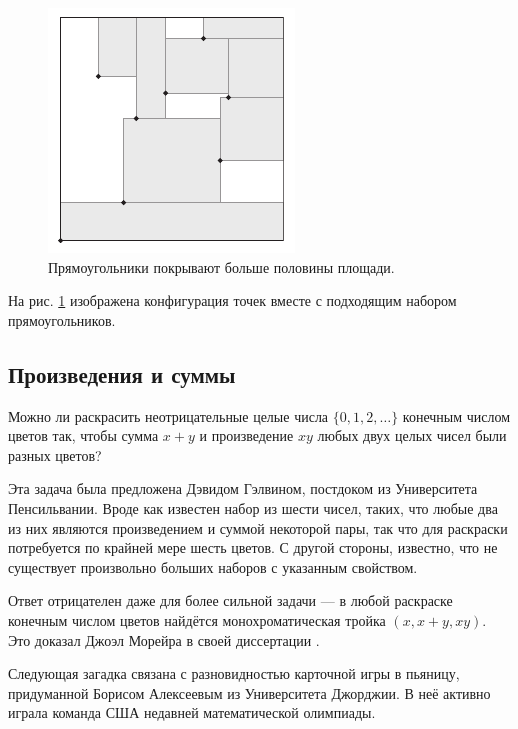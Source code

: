 \begin{figure}[htb!]
\centering
\includegraphics[scale=1]{pics/square}
\caption{Прямоугольники покрывают больше половины площади.}
\label{pic:square}
\end{figure}

На рис. \ref{pic:square} изображена конфигурация точек вместе с подходящим набором прямоугольников.

\subsection*{Произведения и суммы}

Можно ли раскрасить неотрицательные целые числа $\{0,1,2,\dots\}$ конечным числом цветов так, чтобы сумма $x+y$ и произведение $xy$ любых двух целых чисел были разных цветов?

\medskip

Эта задача была предложена Дэвидом Гэлвином, постдоком из Университета Пенсильвании.
Вроде как известен набор из шести чисел, таких, что любые два из них являются произведением и суммой некоторой пары, так что для раскраски потребуется по крайней мере шесть цветов.
С другой стороны, известно, что не существует произвольно больших наборов с указанным свойством.

\begin{addedbytheeditors}
Ответ отрицателен даже для более сильной задачи --- в любой раскраске конечным числом цветов найдётся монохроматическая тройка $(x,x+y,xy)$.
Это доказал Джоэл Морейра в своей диссертации \cite{moreira}.
\pr
\end{addedbytheeditors}


\medskip

Следующая загадка связана с разновидностью карточной игры в пьяницу, придуманной Борисом Алексеевым из Университета Джорджии.
В неё активно играла команда США недавней математической олимпиады.

